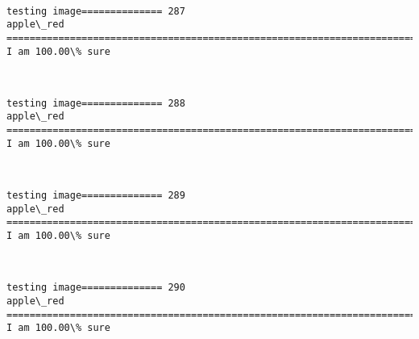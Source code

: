 \documentclass[11pt]{article}
\begin{document}
    \begin{center}
    \end{center}
    { \hspace*{\fill} \\}
    
    \begin{Verbatim}[commandchars=\\\{\}]
testing image============== 287
apple\_red
============================================================================
I am 100.00\% sure

    \end{Verbatim}

    \begin{center}
    \end{center}
    { \hspace*{\fill} \\}
    
    \begin{Verbatim}[commandchars=\\\{\}]
testing image============== 288
apple\_red
============================================================================
I am 100.00\% sure

    \end{Verbatim}

    \begin{center}
    \end{center}
    { \hspace*{\fill} \\}
    
    \begin{Verbatim}[commandchars=\\\{\}]
testing image============== 289
apple\_red
============================================================================
I am 100.00\% sure

    \end{Verbatim}

    \begin{center}
    \end{center}
    { \hspace*{\fill} \\}
    
    \begin{Verbatim}[commandchars=\\\{\}]
testing image============== 290
apple\_red
============================================================================
I am 100.00\% sure

    \end{Verbatim}
\end{document}
